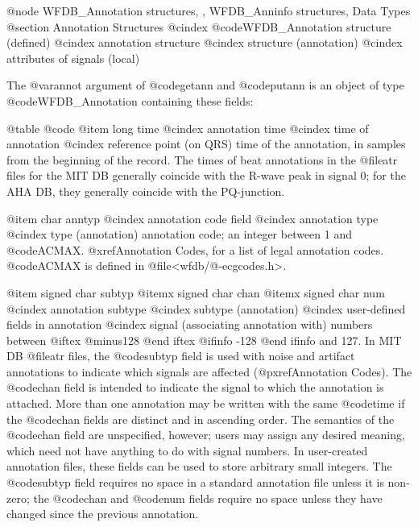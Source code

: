 {{{{{{{{{{@node WFDB_Annotation structures, , WFDB_Anninfo structures, Data Types
@section Annotation Structures
@cindex @code{WFDB_Annotation} structure (defined)
@cindex annotation structure
@cindex structure (annotation)
@cindex attributes of signals (local)

The @var{annot} argument of @code{getann} and @code{putann} is an
object of type @code{WFDB_Annotation} containing these fields:

@table @code
@item long time
@cindex annotation time
@cindex time of annotation
@cindex reference point (on QRS)
time of the annotation, in samples from the beginning of the record.
The times of beat annotations in the @file{atr} files for the MIT DB
generally coincide with the R-wave peak in signal 0; for the AHA DB,
they generally coincide with the PQ-junction.

@item char anntyp
@cindex annotation code field
@cindex annotation type
@cindex type (annotation)
annotation code; an integer between 1 and @code{ACMAX}.
@xref{Annotation Codes}, for a list of legal annotation codes.
@code{ACMAX} is defined in @file{<wfdb/@-ecgcodes.h>}.

@item signed char subtyp
@itemx signed char chan
@itemx signed char num
@cindex annotation subtype
@cindex subtype (annotation)
@cindex user-defined fields in annotation
@cindex signal (associating annotation with)
numbers between
@iftex
@minus{}128
@end iftex
@ifinfo
-128
@end ifinfo
and 127.  In MIT DB @file{atr} files, the
@code{subtyp} field is used with noise and artifact annotations to
indicate which signals are affected (@pxref{Annotation Codes}).
The @code{chan} field is intended to indicate the signal to which the
annotation is attached.  More than one annotation may be written with
the same @code{time} if the @code{chan} fields are distinct and in
ascending order.  The semantics of the @code{chan} field are
unspecified, however; users may assign any desired meaning, which need
not have anything to do with signal numbers.  In user-created annotation
files, these fields can be used to store arbitrary small integers.  The
@code{subtyp} field requires no space in a standard annotation file
unless it is non-zero; the @code{chan} and @code{num} fields require no
space unless they have changed since the previous annotation.

}}}}}}}}}}
